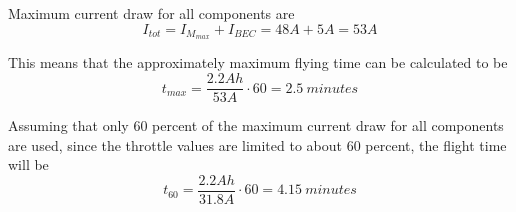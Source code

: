 Maximum current draw for all components are
\begin{equation}
  I_{tot} = I_{M}_{max} + I_{BEC} =  48A + 5A = 53A  
\end{equation}

This means that the approximately maximum flying time can be calculated to be
\begin{equation}
  t_{max} = \frac{2.2Ah}{53A}\cdot60 = 2.5\:minutes
\end{equation}

Assuming that only 60 percent of the maximum current draw for all components are used, since the throttle values are limited to about 60 percent, the flight time will be
\begin{equation}
  t_{60} = \frac{2.2Ah}{31.8A}\cdot60 = 4.15 \: minutes
\end{equation}

\newpage
